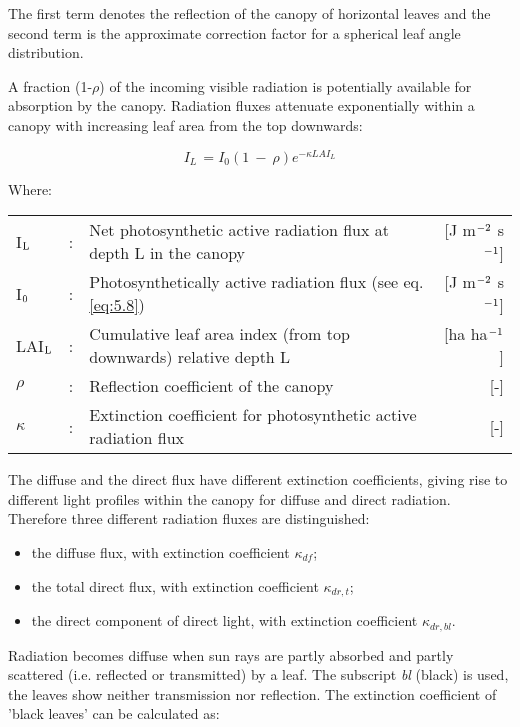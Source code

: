 The first term denotes the reflection of the canopy of horizontal leaves and the second
term is the approximate correction factor for a spherical leaf angle distribution.

A fraction (1-$\rho$) of the incoming visible radiation is potentially available for absorption by
the canopy. Radiation fluxes attenuate exponentially within a canopy with increasing leaf
area from the top downwards:

\begin{equation}
\label{eq:5.13}
I_{L~} = I_{0} (1~-~\rho ) e^{-\kappa LAI_{L} }
\end{equation}

Where:\\[5pt]
\begin{tabularx}{\textwidth}{llXr}
	I$_{{\rm L}}$   &:& Net photosynthetic active radiation flux at 
	depth L in the canopy    &    [J m$^{{\rm -2}}$ s$^{{\rm -1}}$]\\
	I$_{{\rm 0}}$   &:& Photosynthetically active radiation flux (see eq. \ref{eq:5.8})  & 
	[J m$^{{\rm -2}}$ s$^{{\rm -1}}$]\\
	LAI$_{{\rm L}}$ &:& Cumulative leaf area index (from top downwards) 
	relative depth L & [ha ha$^{{\rm -1}}$]\\
	$\rho$          &:& Reflection coefficient of the canopy   &     [-]\\
	$\kappa$        &:& Extinction coefficient for photosynthetic active 
	radiation flux   &     [-]\\
\end{tabularx}

The diffuse and the direct flux have different extinction coefficients, giving rise to
different light profiles within the canopy for diffuse and direct radiation. Therefore three
different radiation fluxes are distinguished:
\begin{itemize}
	\item the diffuse flux, with extinction coefficient $\kappa_{df}$;
	\item the total direct flux, with extinction coefficient $\kappa_{dr,t}$;
	\item the direct component of direct light, with extinction coefficient $\kappa_{dr,bl}$.
\end{itemize}

Radiation becomes diffuse when sun rays are partly absorbed and partly scattered (i.e.
reflected or transmitted) by a leaf. The subscript {\it bl} (black) is used, the leaves show
neither transmission nor reflection. The extinction coefficient of 'black leaves'
can be calculated as:

